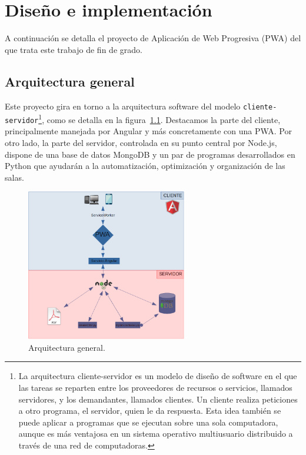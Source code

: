\documentclass[a4paper, 12pt]{book}
\begin{document}
\chapter{Diseño e implementación}

A continuación se detalla el proyecto de Aplicación de Web Progresiva (PWA) del que trata este trabajo de fin de grado.

\section{Arquitectura general} 
\label{sec:arquitectura}
Este proyecto gira en torno a la arquitectura software del modelo \texttt{cliente-servidor}\footnote{La arquitectura cliente-servidor es un modelo de diseño de software en el que las tareas se reparten entre los proveedores de recursos o servicios, llamados servidores, y los demandantes, llamados clientes. Un cliente realiza peticiones a otro programa, el servidor, quien le da respuesta. Esta idea también se puede aplicar a programas que se ejecutan sobre una sola computadora, aunque es más ventajosa en un sistema operativo multiusuario distribuido a través de una red de computadoras.}, como se detalla en la figura~\ref{fig:arquitectura}. Destacamos la parte del cliente, principalmente manejada por Angular y más concretamente con una PWA. Por otro lado, la parte del servidor, controlada en su punto central por Node.js, dispone de una base de datos MongoDB y un par de programas desarrollados en Python que ayudarán a la automatización, optimización y organización de las salas.
\begin{figure}[h!]
  \centering
  \includegraphics[width=7cm, keepaspectratio]{img/arquitectura.png}
  \caption{Arquitectura general.}\label{fig:arquitectura}
\end{figure}

 
\end{document}

